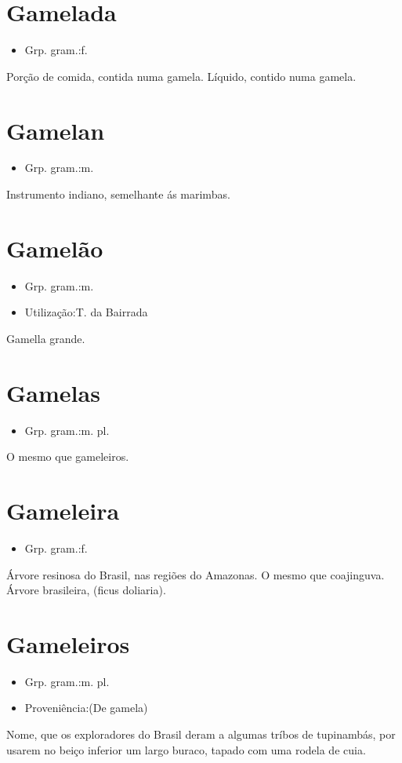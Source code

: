 \section{Gamelada}
\begin{itemize}
\item {Grp. gram.:f.}
\end{itemize}
Porção de comida, contida numa gamela.
Líquido, contido numa gamela.
\section{Gamelan}
\begin{itemize}
\item {Grp. gram.:m.}
\end{itemize}
Instrumento indiano, semelhante ás marimbas.
\section{Gamelão}
\begin{itemize}
\item {Grp. gram.:m.}
\end{itemize}
\begin{itemize}
\item {Utilização:T. da Bairrada}
\end{itemize}
Gamella grande.
\section{Gamelas}
\begin{itemize}
\item {Grp. gram.:m. pl.}
\end{itemize}
O mesmo que \textunderscore gameleiros\textunderscore .
\section{Gameleira}
\begin{itemize}
\item {Grp. gram.:f.}
\end{itemize}
Árvore resinosa do Brasil, nas regiões do Amazonas.
O mesmo que \textunderscore coajinguva\textunderscore .
Árvore brasileira, (\textunderscore ficus doliaria\textunderscore ).
\section{Gameleiros}
\begin{itemize}
\item {Grp. gram.:m. pl.}
\end{itemize}
\begin{itemize}
\item {Proveniência:(De \textunderscore gamela\textunderscore )}
\end{itemize}
Nome, que os exploradores do Brasil deram a algumas tríbos de tupinambás, por usarem no beiço inferior um largo buraco, tapado com uma rodela de cuia.
